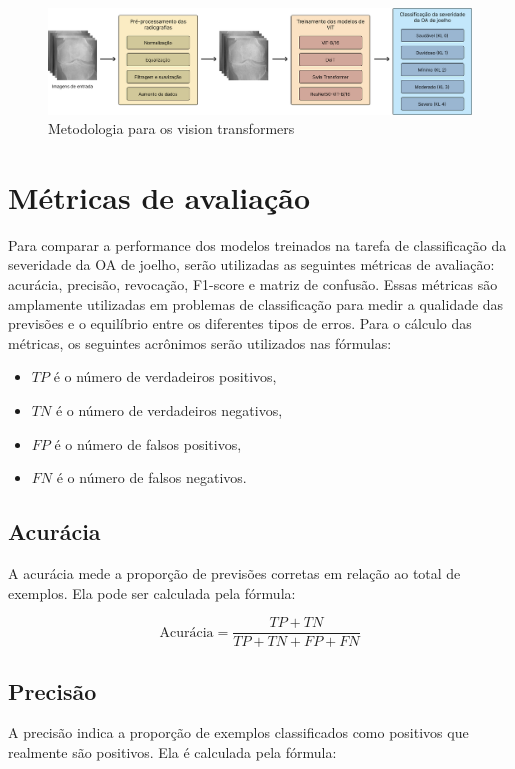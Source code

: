 \begin{figure}[h]
    \centering
    \includegraphics[width=\linewidth]{figs/modelo-vit.png}
    \caption{Metodologia para os vision transformers}
    \label{modelo vit}
\end{figure}

\section{Métricas de avaliação}

Para comparar a performance dos modelos treinados na tarefa de classificação da severidade da OA de joelho, serão utilizadas as seguintes métricas de avaliação: acurácia, precisão, revocação, F1-score e matriz de confusão. Essas métricas são amplamente utilizadas em problemas de classificação para medir a qualidade das previsões e o equilíbrio entre os diferentes tipos de erros. Para o cálculo das métricas, os seguintes acrônimos serão utilizados nas fórmulas:

\begin{itemize}
    \item $TP$ é o número de verdadeiros positivos,
    \item $TN$ é o número de verdadeiros negativos,
    \item $FP$ é o número de falsos positivos,
    \item $FN$ é o número de falsos negativos.
\end{itemize}

\subsection{Acurácia}
A acurácia mede a proporção de previsões corretas em relação ao total de exemplos. Ela pode ser calculada pela fórmula:

\begin{equation}
    \text{Acurácia} = \frac{TP + TN}{TP + TN + FP + FN}
\end{equation}

\subsection{Precisão}
A precisão indica a proporção de exemplos classificados como positivos que realmente são positivos. Ela é calculada pela fórmula:

